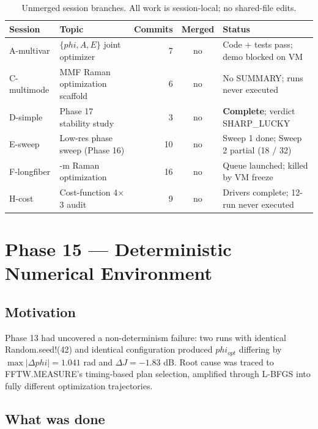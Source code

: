 \documentclass[11pt,letterpaper]{article}
\def\varphi{phi}%
\def\mathrm#1{#1}%
\def\texttt#1{#1}%
\begin{document}
\begin{table}[H]
\centering
\small
\begin{tabular}{>{\raggedright\arraybackslash}p{2.3cm}>{\raggedright\arraybackslash}p{5.2cm}rc>{\raggedright\arraybackslash}p{5.8cm}}
\toprule
Session & Topic & Commits & Merged & Status \\
\midrule
A-multivar   & $\{\varphi, A, E\}$ joint optimizer      & 7  & no & Code $+$ tests pass; demo blocked on VM \\
C-multimode  & MMF Raman optimization scaffold          & 6  & no & No SUMMARY; runs never executed \\
D-simple     & Phase 17 stability study                 & 3  & no & \textbf{Complete}; verdict SHARP\_LUCKY \\
E-sweep      & Low-res phase sweep (Phase 16)           & 10 & no & Sweep 1 done; Sweep 2 partial (18 / 32) \\
F-longfiber  & 100-m Raman optimization                 & 16 & no & Queue launched; killed by VM freeze \\
H-cost       & Cost-function 4$\times$3 audit           & 9  & no & Drivers complete; 12-run never executed \\
\bottomrule
\end{tabular}
\caption{Unmerged session branches. All work is session-local; no shared-file edits.}
\end{table}

\newpage
\section{Phase 15 --- Deterministic Numerical Environment}
\label{sec:phase15}

\subsection{Motivation}

Phase 13 had uncovered a non-determinism failure: two runs with identical \texttt{Random.seed!(42)} and identical configuration produced $\varphi_{\mathrm{opt}}$ differing by $\max|\Delta\varphi| = 1.041$ rad and $\Delta J = -1.83$ dB. Root cause was traced to \texttt{FFTW.MEASURE}'s timing-based plan selection, amplified through L-BFGS into fully different optimization trajectories.

\subsection{What was done}
\end{document}
